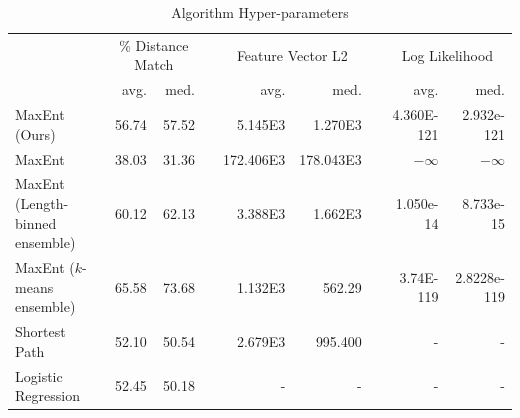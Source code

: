 \documentclass[letterpaper, 10 pt, conference]{ieeeconf}
\begin{document}
\lipsum[1]

\begin{table}[t!]
    
    \centering
    \caption{Algorithm Hyper-parameters}
    \label{tab:results}
    \medskip
    
    {\def\arraystretch{1.2}
        \begin{tabularx}{\textwidth}{X rr c rr c rr}
            
            \toprule
            
            & \multicolumn{2}{c}{\% Distance Match} & \phantom{a} & \multicolumn{2}{c}{Feature Vector L2} & \phantom{a} & \multicolumn{2}{c}{Log Likelihood} \\
            
            \cmidrule{2-3} \cmidrule{5-6} \cmidrule{8-9}
            
            & {avg.} & {med.} & & {avg.} & {med.} & & {avg.} & {med.} \\
            
            \midrule
            
            MaxEnt (Ours) &
            56.74 & 57.52 &  & 5.145E3 & 1.270E3 &  & 4.360E-121 & 2.932e-121 \\
            
            MaxEnt \cite{Ziebart2008} &
            38.03 & 31.36 &  & 172.406E3 & 178.043E3 &  & $-\infty$ & $-\infty$ \\
            
            MaxEnt (Length-binned ensemble) &
            60.12 & 62.13 &  & 3.388E3 & 1.662E3 &  & 1.050e-14 & 8.733e-15 \\
            
            MaxEnt ($k$-means ensemble) &
            65.58 & 73.68 &  & 1.132E3 & 562.29 &  & 3.74E-119 & 2.8228e-119 \\[10pt]
            
            
            Shortest Path &
            52.10 & 50.54 &  & 2.679E3 & 995.400 &  & {-} & {-} \\
            
            Logistic Regression &
            52.45 & 50.18 &  & {-} & {-} &  & {-} & {-} \\
            
            \bottomrule
            
        \end{tabularx}
    }
    
\end{table}
\end{document}
